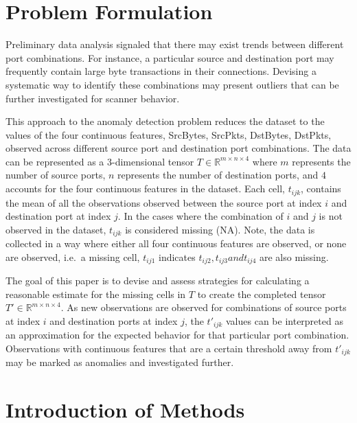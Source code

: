 \documentclass[12pt,twoside]{dukestatscithesis}
\theoremstyle{definition}
\theoremstyle{definition}
\theoremstyle{definition}
\theoremstyle{remark}
\begin{document}
\section{Problem Formulation}\label{problem-formulation}

Preliminary data analysis signaled that there may exist trends between
different port combinations. For instance, a particular source and
destination port may frequently contain large byte transactions in their
connections. Devising a systematic way to identify these combinations
may present outliers that can be further investigated for scanner
behavior.

This approach to the anomaly detection problem reduces the dataset to
the values of the four continuous features, SrcBytes, SrcPkts, DstBytes,
DstPkts, observed across different source port and destination port
combinations. The data can be represented as a 3-dimensional tensor
\(T \in \mathbb{R}^{m \times n \times 4}\) where \(m\) represents the
number of source ports, \(n\) represents the number of destination
ports, and \(4\) accounts for the four continuous features in the
dataset. Each cell, \(t_{ijk}\), contains the mean of all the
observations observed between the source port at index \(i\) and
destination port at index \(j\). In the cases where the combination of
\(i\) and \(j\) is not observed in the dataset, \(t_{ijk}\) is
considered missing (NA). Note, the data is collected in a way where
either all four continuous features are observed, or none are observed,
i.e.~a missing cell, \(t_{ij1}\) indicates
\(t_{ij2}, t_{ij3} and t_{ij4}\) are also missing.

The goal of this paper is to devise and assess strategies for
calculating a reasonable estimate for the missing cells in \(T\) to
create the completed tensor \(T' \in \mathbb{R}^{m \times n \times 4}\).
As new observations are observed for combinations of source ports at
index \(i\) and destination ports at index \(j\), the \(t'_{ijk}\)
values can be interpreted as an approximation for the expected behavior
for that particular port combination. Observations with continuous
features that are a certain threshold away from \(t'_{ijk}\) may be
marked as anomalies and investigated further.

\section{Introduction of Methods}\label{introduction-of-methods}
\end{document}
